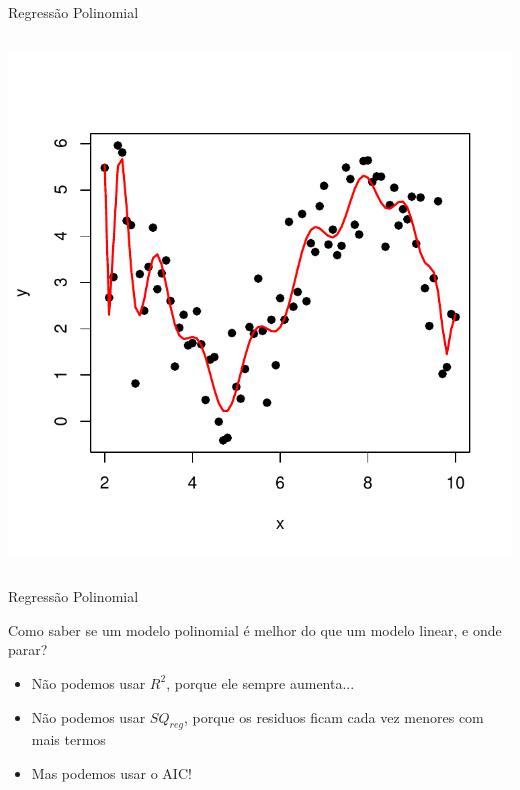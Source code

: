 \documentclass{beamer}\usepackage[]{graphicx}\usepackage[]{color}
\newenvironment{knitrout}{}{} %
\renewenvironment{knitrout}{\setlength{\topsep}{0mm}}{}
\begin{document}
\begin{frame}[fragile]{Regressão Polinomial}
\begin{columns}
\begin{knitrout}
\color{fgcolor}
\includegraphics[width=1\linewidth]{figure/samppol20plot-1} 

\end{knitrout}


\end{columns}

\end{frame}


\begin{frame}{Regressão Polinomial}

Como saber se um modelo polinomial é melhor do que um modelo linear, e onde parar?
\vfill
\begin{itemize}
\item Não podemos usar $R^2$, porque ele sempre aumenta... \pause
\vfill
\item Não podemos usar $SQ_{reg}$, porque os residuos ficam cada vez menores com mais termos \pause
\vfill
\item Mas podemos usar o AIC!

\end{itemize}

\end{frame}
\end{document}
